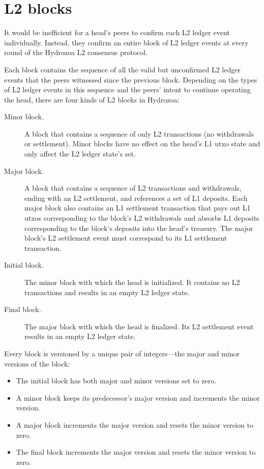 \documentclass[../hydrozoa.tex]{subfiles}
\begin{document}
\chapter{L2 blocks}%
\label{h:l2-blocks}%

It would be inefficient for a head's peers to confirm each L2 ledger event individually.
Instead, they confirm an entire block of L2 ledger events at every round of the Hydrozoa L2 consensus protocol.

Each block contains the sequence of all the valid but unconfirmed L2 ledger events that the peers witnessed since the previous block.
Depending on the types of L2 ledger events in this sequence and the peers' intent to continue operating the head, there are four kinds of L2 blocks in Hydrozoa:
\begin{description}
  \item[Minor block.] A block that contains a sequence of only L2 transactions (no withdrawals or settlement).
    Minor blocks have no effect on the head's L1 utxo state and only affect the L2 ledger state's  set.
  \item[Major block.] A block that contains a sequence of L2 transactions and withdrawals, ending with an L2 settlement, and references a set of L1 deposits.
    Each major block also contains an L1 settlement transaction that pays out L1 utxos corresponding to the block's L2 withdrawals and absorbs L1 deposits corresponding to the block's deposits into the head's treasury.
    The major block's L2 settlement event must correspond to its L1 settlement transaction.
  \item[Initial block.] The minor block with which the head is initialized.
    It contains no L2 transactions and results in an empty L2 ledger state.
  \item[Final block.] The major block with which the head is finalized.
    Its L2 settlement event results in an empty L2 ledger state.
\end{description}

Every block is versioned by a unique pair of integers---the major and minor versions of the block:
\begin{itemize}
  \item The initial block has both major and minor versions set to zero.
  \item A minor block keeps its predecessor's major version and increments the minor version.
  \item A major block increments the major version and resets the minor version to zero.
  \item The final block increments the major version and resets the minor version to zero.
\end{itemize}
\end{document}
